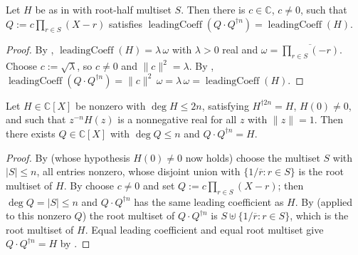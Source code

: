 \begin{lemma}
    \label{lem:fr-leading-coeff}
    \leanok
    Let $H$ be as in  with root-half multiset $S$. Then
    there is $c \in \mathbb{C}$, $c \neq 0$, such that
    $Q := c\prod_{r \in S}(X - r)$ satisfies
    $\operatorname{leadingCoeff}(Q\cdot Q^{\dagger n})
    = \operatorname{leadingCoeff}(H)$.
\end{lemma}
\begin{proof}
    By , $\operatorname{leadingCoeff}(H)
    = \lambda\,\omega$ with $\lambda > 0$ real and
    $\omega = \overline{\prod_{r \in S}(-r)}$. Choose $c := \sqrt{\lambda}$, so
    $c \neq 0$ and $\|c\|^2 = \lambda$. By ,
    $\operatorname{leadingCoeff}(Q\cdot Q^{\dagger n}) = \|c\|^2\,\omega
    = \lambda\,\omega = \operatorname{leadingCoeff}(H)$.
\end{proof}

\begin{lemma}
    \label{lem:fr-zero-free}
    \leanok
    Let $H \in \mathbb{C}[X]$ be nonzero with $\deg H \le 2n$, satisfying
    $H^{\dagger 2n} = H$, $H(0) \neq 0$, and such that $z^{-n}H(z)$ is a
    nonnegative real for all $z$ with $\|z\| = 1$. Then there exists
    $Q \in \mathbb{C}[X]$ with $\deg Q \le n$ and $Q\cdot Q^{\dagger n} = H$.
\end{lemma}
\begin{proof}
    By  (whose hypothesis $H(0) \neq 0$ now holds) choose
    the multiset $S$ with $|S| \le n$, all entries nonzero, whose disjoint union
    with $\{1/\overline{r} : r \in S\}$ is the root multiset of $H$. By
     choose $c \neq 0$ and set
    $Q := c\prod_{r \in S}(X - r)$; then $\deg Q = |S| \le n$ and
    $Q\cdot Q^{\dagger n}$ has the same leading coefficient as $H$. By
     (applied to this nonzero $Q$) the root multiset of
    $Q\cdot Q^{\dagger n}$ is $S \uplus \{1/\overline{r} : r \in S\}$, which is the
    root multiset of $H$. Equal leading coefficient and equal root multiset give
    $Q\cdot Q^{\dagger n} = H$ by .
\end{proof}

